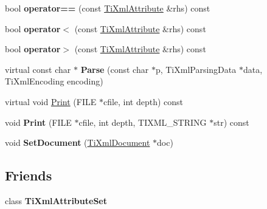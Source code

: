 \begin{DoxyCompactItemize}
\item 
\hypertarget{class_ti_xml_attribute_ae48c2a65b520d453914ce4e845d607cf}{bool {\bfseries operator==} (const \hyperlink{class_ti_xml_attribute}{Ti\-Xml\-Attribute} \&rhs) const }\label{class_ti_xml_attribute_ae48c2a65b520d453914ce4e845d607cf}

\item 
\hypertarget{class_ti_xml_attribute_adb8b6f2cad5948e73e383182e7ce10de}{bool {\bfseries operator$<$} (const \hyperlink{class_ti_xml_attribute}{Ti\-Xml\-Attribute} \&rhs) const }\label{class_ti_xml_attribute_adb8b6f2cad5948e73e383182e7ce10de}

\item 
\hypertarget{class_ti_xml_attribute_a867562769ef9778c1690cd373246b05b}{bool {\bfseries operator$>$} (const \hyperlink{class_ti_xml_attribute}{Ti\-Xml\-Attribute} \&rhs) const }\label{class_ti_xml_attribute_a867562769ef9778c1690cd373246b05b}

\item 
\hypertarget{class_ti_xml_attribute_a1437efc74bb8d49da5290772202b5e68}{virtual const char $\ast$ {\bfseries Parse} (const char $\ast$p, Ti\-Xml\-Parsing\-Data $\ast$data, Ti\-Xml\-Encoding encoding)}\label{class_ti_xml_attribute_a1437efc74bb8d49da5290772202b5e68}

\item 
virtual void \hyperlink{class_ti_xml_attribute_acc04956c1d5c4c31fe74f7a7528d109a}{Print} (F\-I\-L\-E $\ast$cfile, int depth) const 
\item 
\hypertarget{class_ti_xml_attribute_a19e6b6862a80b188571c47947e88d030}{void {\bfseries Print} (F\-I\-L\-E $\ast$cfile, int depth, T\-I\-X\-M\-L\-\_\-\-S\-T\-R\-I\-N\-G $\ast$str) const }\label{class_ti_xml_attribute_a19e6b6862a80b188571c47947e88d030}

\item 
\hypertarget{class_ti_xml_attribute_ac12a94d4548302afb12f488ba101f7d1}{void {\bfseries Set\-Document} (\hyperlink{class_ti_xml_document}{Ti\-Xml\-Document} $\ast$doc)}\label{class_ti_xml_attribute_ac12a94d4548302afb12f488ba101f7d1}

\end{DoxyCompactItemize}
\subsection*{Friends}
\begin{DoxyCompactItemize}
\item 
\hypertarget{class_ti_xml_attribute_a35a7b7f89f708527677d5078d41ce0bf}{class {\bfseries Ti\-Xml\-Attribute\-Set}}\label{class_ti_xml_attribute_a35a7b7f89f708527677d5078d41ce0bf}

\end{DoxyCompactItemize}
